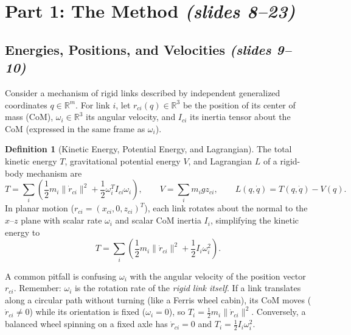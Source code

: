 \documentclass[11pt, a4paper]{article}
\theoremstyle{definition}
\newtheorem{definition}{Definition}[section]
\theoremstyle{plain}
\begin{document}
\section{Part 1: The Method \emph{(slides 8--23)}}

\subsection{Energies, Positions, and Velocities \emph{(slides 9--10)}}

Consider a mechanism of rigid links described by independent generalized coordinates $q \in \mathbb{R}^m$. For link $i$, let $r_{ci}(q) \in \mathbb{R}^3$ be the position of its center of mass (CoM), $\omega_i \in \mathbb{R}^3$ its angular velocity, and $I_{ci}$ its inertia tensor about the CoM (expressed in the same frame as $\omega_i$).

\begin{definition}[Kinetic Energy, Potential Energy, and Lagrangian]
The total kinetic energy $T$, gravitational potential energy $V$, and Lagrangian $L$ of a rigid-body mechanism are
\[
  T = \sum_{i} \left( \frac{1}{2} m_i \|\dot{r}_{ci}\|^2 + \frac{1}{2} \omega_i^T I_{ci} \omega_i \right), \qquad
  V = \sum_{i} m_i g z_{ci}, \qquad
  L(q, \dot{q}) = T(q, \dot{q}) - V(q).
\]
In planar motion ($r_{ci} = (x_{ci}, 0, z_{ci})^T$), each link rotates about the normal to the $x$--$z$ plane with scalar rate $\omega_i$ and scalar CoM inertia $I_i$, simplifying the kinetic energy to
\[
  T = \sum_{i} \left( \frac{1}{2} m_i \|\dot{r}_{ci}\|^2 + \frac{1}{2} I_i \omega_i^2 \right).
\]
\end{definition}

\begin{intuition}
A common pitfall is confusing $\omega_i$ with the angular velocity of the position vector $r_{ci}$. Remember: $\omega_i$ is the rotation rate of the \emph{rigid link itself}. If a link translates along a circular path without turning (like a Ferris wheel cabin), its CoM moves ($\dot{r}_{ci} \neq 0$) while its orientation is fixed ($\omega_i = 0$), so $T_i = \frac{1}{2} m_i \|\dot{r}_{ci}\|^2$. Conversely, a balanced wheel spinning on a fixed axle has $\dot{r}_{ci} = 0$ and $T_i = \frac{1}{2} I_i \omega_i^2$.
\end{intuition}
\end{document}

